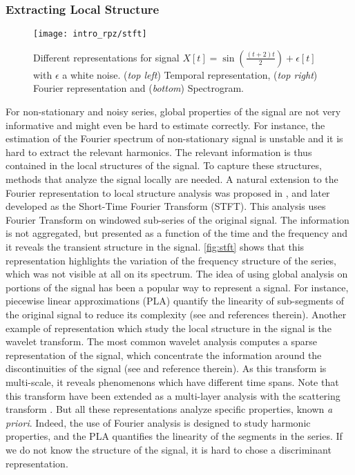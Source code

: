 \documentclass[../thesis.tex]{subfiles}
\begin{document}
\subsubsection{Extracting Local Structure}
\label{subs:intro:rpz:local}


\begin{figure}[tp]
	\centering
	\texttt{[image: intro\_rpz/stft]}
	\caption{Different representations for signal $X[t] = \sin\left(\frac{(t+2)t}{2}\right) + \epsilon[t]$ with $\epsilon$ a white noise. (\emph{top left}) Temporal representation, (\emph{top right}) Fourier representation and (\emph{bottom}) Spectrogram.
	}
	\label{fig:stft}
\end{figure}


For non-stationary and noisy series, global properties of the signal are not very informative and might even be hard to estimate correctly. For instance, the estimation of the Fourier spectrum of non-stationary signal is unstable and it is hard to extract the relevant harmonics. The relevant information is thus contained in the local structures of the signal. To capture these structures, methods that analyze the signal locally are needed. A natural extension to the Fourier representation to local structure analysis was proposed in \citet{Gabor1946}, and later developed as the Short-Time Fourier Transform (STFT). This analysis uses Fourier Transform on windowed sub-series of the original signal. The information is not aggregated, but presented as a function of the time and the frequency and it reveals the transient structure in the signal. \autoref{fig:stft} shows that this representation highlights the variation of the frequency structure of the series, which was not visible at all on its spectrum. The idea of using global analysis on portions of the signal has been a popular way to represent a signal. For instance, piecewise linear approximations (PLA) quantify the linearity of sub-segments of the original signal to reduce its complexity (see \citealt{Keogh2001} and references therein). Another example of representation which study the local structure in the signal is the wavelet transform. The most common wavelet analysis computes a sparse representation of the signal, which concentrate the information around the discontinuities of the signal (see \citealt{Mallat2008} and reference therein). As this transform is multi-scale, it reveals phenomenons which have different time spans. Note that this transform have been extended as a multi-layer analysis with the scattering transform \citep{Mallat2012}. But all these representations analyze specific properties, known \emph{a priori}. Indeed, the use of Fourier analysis is designed to study harmonic properties, and the PLA quantifies the linearity of the segments in the series. If we do not know the structure of the signal, it is hard to chose a discriminant representation.
\end{document}
